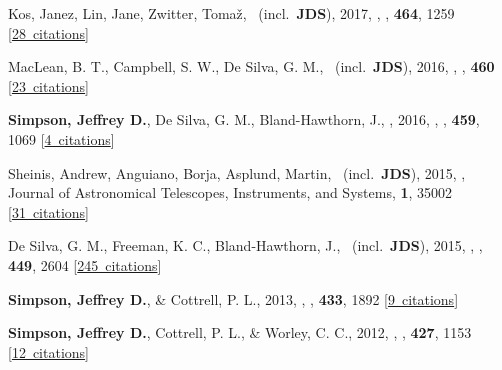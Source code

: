 \item[{\color{numcolor}\scriptsize7}] Kos, Janez, Lin, Jane, Zwitter, Toma{\v{z}}, \etal\ (incl.\ \textbf{JDS}), 2017, , \mnras, \textbf{464}, 1259 [\href{https://ui.adsabs.harvard.edu/#abs/2017MNRAS.464.1259K}{28~citations}]

\item[{\color{numcolor}\scriptsize6}] MacLean, B. T., Campbell, S. W., De Silva, G. M., \etal\ (incl.\ \textbf{JDS}), 2016, , \mnras, \textbf{460} [\href{https://ui.adsabs.harvard.edu/#abs/2016MNRAS.460L..69M}{23~citations}]

\item[{\color{numcolor}\scriptsize5}] \textbf{Simpson, Jeffrey D.}, De Silva, G. M., Bland-Hawthorn, J., \etal, 2016, , \mnras, \textbf{459}, 1069 [\href{https://ui.adsabs.harvard.edu/#abs/2016MNRAS.459.1069S}{4~citations}]

\item[{\color{numcolor}\scriptsize4}] Sheinis, Andrew, Anguiano, Borja, Asplund, Martin, \etal\ (incl.\ \textbf{JDS}), 2015, , Journal of Astronomical Telescopes, Instruments, and Systems, \textbf{1}, 35002 [\href{https://ui.adsabs.harvard.edu/#abs/2015JATIS...1c5002S}{31~citations}]

\item[{\color{numcolor}\scriptsize3}] De Silva, G. M., Freeman, K. C., Bland-Hawthorn, J., \etal\ (incl.\ \textbf{JDS}), 2015, , \mnras, \textbf{449}, 2604 [\href{https://ui.adsabs.harvard.edu/#abs/2015MNRAS.449.2604D}{245~citations}]

\item[{\color{numcolor}\scriptsize2}] \textbf{Simpson, Jeffrey D.}, \& Cottrell, P. L., 2013, , \mnras, \textbf{433}, 1892 [\href{https://ui.adsabs.harvard.edu/#abs/2013MNRAS.433.1892S}{9~citations}]

\item[{\color{numcolor}\scriptsize1}] \textbf{Simpson, Jeffrey D.}, Cottrell, P. L., \& Worley, C. C., 2012, , \mnras, \textbf{427}, 1153 [\href{https://ui.adsabs.harvard.edu/#abs/2012MNRAS.427.1153S}{12~citations}]